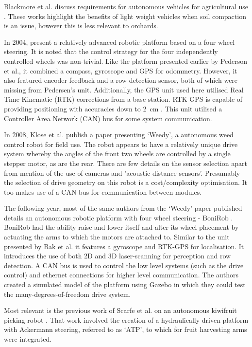 \documentclass[preprint,authoryear,12pt]{elsarticle}
\begin{document}
    Blackmore et al. discuss requirements for autonomous vehicles for agricultural use \citep{Blackmore2004,Blackmore2007}.
    These works highlight the benefits of light weight vehicles when soil compaction is an issue, however this is less relevant to orchards.
    
    In 2004, \citep{Bak2004} present a relatively advanced robotic platform based on a four wheel steering.
    It is noted that the control strategy for the four independently controlled wheels was non-trivial.
    Like the platform presented earlier by Pederson et al., it combined a compass, gyroscope and GPS for odommetry.
    However, it also featured encoder feedback and a row detection sensor, both of which were missing from Pedersen's unit.
    Additionally, the GPS unit used here utilised Real Time Kinematic (RTK) corrections from a base station.
    RTK-GPS is capable of providing positioning with accuracies down to \SI{2}{\centi\meter} \citep{Durrant-Whyte2005}.
    This unit utilised a Controller Area Network (CAN) bus for some system communication.

    In 2008, Klose et al. publish a paper presenting `Weedy', a autonomous weed control robot for field use.
    The robot appears to have a relatively unique drive system whereby the angles of the front two wheels are controlled by a single stepper motor, as are the rear.
    There are few details on the sensor selection apart from mention of the use of cameras and 'acoustic distance sensors'.
    Presumably the selection of drive geometry on this robot is a cost/complexity optimisation.
    It too makes use of a CAN bus for communication between modules.

    The following year, most of the same authors from the `Weedy' paper published details an autonomous robotic platform with four wheel steering - BoniRob \citep{Ruckelshausen2009}.
    BoniRob had the ability raise and lower itself and alter its wheel placement by actuating the arms to which the motors are attached to.
    Similar to the unit presented by Bak et al. it features a gyroscope and RTK-GPS for localisation.
    It introduces the use of both 2D and 3D laser-scanning for perception and row detection.
    A CAN bus is used to control the low level systems (such as the drive control) and ethernet connections for higher level communication.
    The authors created a simulated model of the platform using Gazebo in which they could test the many-degrees-of-freedom drive system.

    Most relevant is the previous work of Scarfe et al. on an autonomous kiwifruit picking robot \cite{scarfe2009, Scarfe2012}.
    That work involved the creation of a hydraulically driven platform with Ackermann steering, referred to as `ATP', to which for fruit harvesting arms were integrated.
\end{document}
